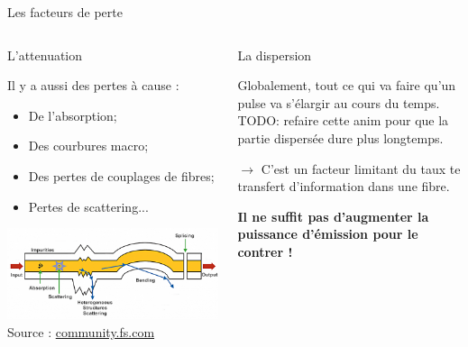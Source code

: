 \documentclass[aspectratio=149, 10pt, t]{beamer}
\begin{document}
\begin{frame}{Les facteurs de perte}
    \begin{columns}
        \begin{column}{0.5\linewidth}
        \medskip
        \alert{L'attenuation}
            
            Il y a aussi des pertes à cause :\begin{itemize}
                \item De l'absorption;
                \item Des courbures macro;
                \item Des pertes de couplages de fibres;
                \item Pertes de scattering...
            \end{itemize}
            \includegraphics[width=\linewidth]{images/different-types-of-losses-in-optical-fiber.png}
            {\footnotesize Source : \href{https://community.fs.com/fr/blog/how-to-reduce-various-types-of-losses-in-optical-fiber.html}{community.fs.com}}

        \end{column}
        \begin{column}{0.5\linewidth}
        \medskip
        \alert{La dispersion}

            Globalement, tout ce qui va faire qu'un pulse va s'élargir au cours du temps.
            TODO: refaire cette anim pour que la partie dispersée dure plus longtemps.

            
            $\longrightarrow$ C'est un facteur limitant du taux te transfert d'information dans une fibre. 

            \textbf{Il ne suffit pas d'augmenter la puissance d'émission pour le contrer !}
        \end{column}
    \end{columns}
\end{frame}
\end{document}
